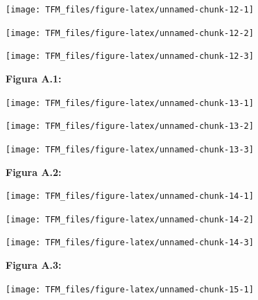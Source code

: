 \documentclass[11pt,spanish,a4paper,oneside,]{book} %
\begin{document}
\begin{center}\texttt{[image: TFM\_files/figure-latex/unnamed-chunk-12-1]} \end{center}

\begin{center}\texttt{[image: TFM\_files/figure-latex/unnamed-chunk-12-2]} \end{center}

\begin{center}\texttt{[image: TFM\_files/figure-latex/unnamed-chunk-12-3]} \end{center}

\begin{center}
\textbf{Figura A.1:}

\end{center}

\begin{center}\texttt{[image: TFM\_files/figure-latex/unnamed-chunk-13-1]} \end{center}

\begin{center}\texttt{[image: TFM\_files/figure-latex/unnamed-chunk-13-2]} \end{center}

\begin{center}\texttt{[image: TFM\_files/figure-latex/unnamed-chunk-13-3]} \end{center}

\begin{center}
\textbf{Figura A.2:}

\end{center}

\begin{center}\texttt{[image: TFM\_files/figure-latex/unnamed-chunk-14-1]} \end{center}

\begin{center}\texttt{[image: TFM\_files/figure-latex/unnamed-chunk-14-2]} \end{center}

\begin{center}\texttt{[image: TFM\_files/figure-latex/unnamed-chunk-14-3]} \end{center}

\begin{center}
\textbf{Figura A.3:}

\end{center}

\begin{center}\texttt{[image: TFM\_files/figure-latex/unnamed-chunk-15-1]} \end{center}
\end{document}

